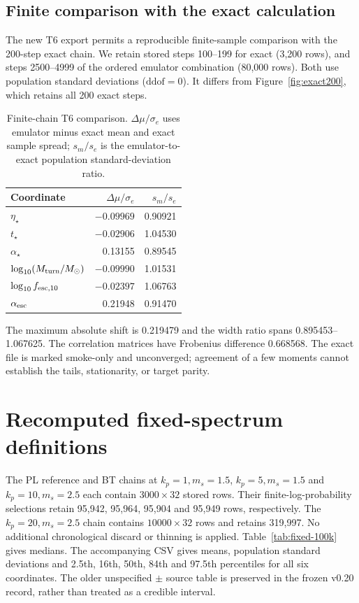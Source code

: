 \subsection{Finite comparison with the exact calculation}

The new T6 export permits a reproducible finite-sample comparison with the 200-step exact chain. We retain stored steps 100--199 for exact (3,200 rows), and steps 2500--4999 of the ordered emulator combination (80,000 rows). Both use population standard deviations ($\mathrm{ddof}=0$). It differs from Figure~\ref{fig:exact200}, which retains all 200 exact steps.

\begin{table}[t]\centering\small
\caption{Finite-chain T6 comparison. $\Delta\mu/\sigma_e$ uses emulator minus exact mean and exact sample spread; $s_m/s_e$ is the emulator-to-exact population standard-deviation ratio.}\label{tab:t6}
\begin{tabular}{lrr}\toprule
Coordinate & $\Delta\mu/\sigma_e$ & $s_m/s_e$\\\midrule
$\eta_\star$ & $-0.09969$ & 0.90921\\
$t_\star$ & $-0.02906$ & 1.04530\\
$\alpha_\star$ & 0.13155 & 0.89545\\
$\log_{10}(M_{\rm turn}/M_\odot)$ & $-0.09990$ & 1.01531\\
$\log_{10}f_{{\rm esc},10}$ & $-0.02397$ & 1.06763\\
$\alpha_{\rm esc}$ & 0.21948 & 0.91470\\\bottomrule
\end{tabular}\end{table}

The maximum absolute shift is 0.219479 and the width ratio spans 0.895453--1.067625. The correlation matrices have Frobenius difference 0.668568. The exact file is marked smoke-only and unconverged; agreement of a few moments cannot establish the tails, stationarity, or target parity.

\section{Recomputed fixed-spectrum definitions}\label{app:recomputed-fixed}

The PL reference and BT chains at $k_p=1,m_s=1.5$, $k_p=5,m_s=1.5$ and $k_p=10,m_s=2.5$ each contain $3000\times32$ stored rows. Their finite-log-probability selections retain 95,942, 95,964, 95,904 and 95,949 rows, respectively. The $k_p=20,m_s=2.5$ chain contains $10000\times32$ rows and retains 319,997. No additional chronological discard or thinning is applied. Table~\ref{tab:fixed-100k} gives medians. The accompanying CSV gives means, population standard deviations and 2.5th, 16th, 50th, 84th and 97.5th percentiles for all six coordinates. The older unspecified $\pm$ source table is preserved in the frozen v0.20 record, rather than treated as a credible interval.

